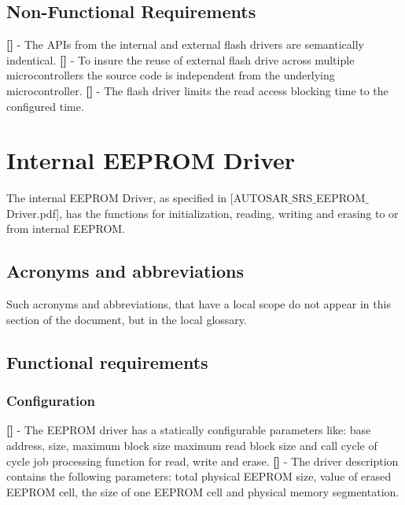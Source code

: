 \subsection{Non-Functional Requirements}
{\bf []} - The APIs from the internal and external flash drivers are semantically indentical.\newline
\newline
{\bf []} - To insure the reuse of external flash drive across multiple microcontrollers the source code is independent from the underlying microcontroller.\newline
\newline
{\bf []} - The flash driver limits the read access blocking time to the configured time.
\newpage

\section{Internal EEPROM Driver}
The internal EEPROM Driver, as specified in  [AUTOSAR$\_$SRS$\_$EEPROM$\_$Driver.pdf], has the functions for initialization, reading, writing and erasing to or from internal \mbox{EEPROM}.
\subsection{Acronyms and abbreviations}
Such acronyms and abbreviations, that have a local scope do not appear in this section of the document, but in the local glossary.
\subsection{Functional requirements}
\subsubsection{Configuration}
{\bf []} - The EEPROM driver has a statically configurable parameters like: base address, size, maximum block size maximum read block size and call cycle of cycle job processing function for read, write and erase.\newline
\newline
{\bf []} - The driver description contains the following parameters: total physical \mbox{EEPROM} size, value of erased \mbox{EEPROM} cell, the size of one \mbox{EEPROM} cell and physical memory segmentation.
